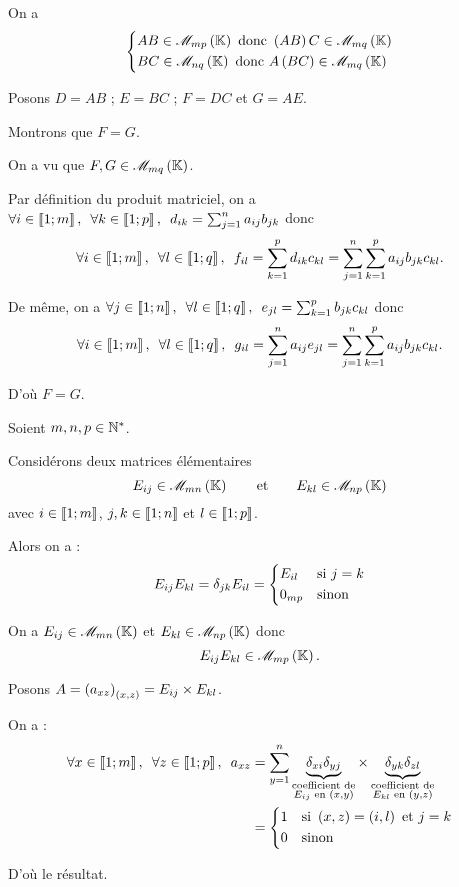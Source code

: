 \begin{dem}
On a \[\begin{dcases}
AB\in\M{mp}\text{ donc }\paren{AB}C\in\M{mq} \\
BC\in\M{nq}\text{ donc }A\paren{BC}\in\M{mq}
\end{dcases}\]

Posons \(D=AB\) ; \(E=BC\) ; \(F=DC\) et \(G=AE\).

Montrons que \(F=G\).

On a vu que \(F,G\in\M{mq}\).

Par définition du produit matriciel, on a \(\quantifs{\forall i\in\interventierii{1}{m};\forall k\in\interventierii{1}{p}}d_{ik}=\sum_{j=1}^na_{ij}b_{jk}\) donc \[\quantifs{\forall i\in\interventierii{1}{m};\forall l\in\interventierii{1}{q}}f_{il}=\sum_{k=1}^pd_{ik}c_{kl}=\sum_{j=1}^n\sum_{k=1}^pa_{ij}b_{jk}c_{kl}.\]

De même, on a \(\quantifs{\forall j\in\interventierii{1}{n};\forall l\in\interventierii{1}{q}}e_{jl}=\sum_{k=1}^pb_{jk}c_{kl}\) donc \[\quantifs{\forall i\in\interventierii{1}{m};\forall l\in\interventierii{1}{q}}g_{il}=\sum_{j=1}^na_{ij}e_{jl}=\sum_{j=1}^n\sum_{k=1}^pa_{ij}b_{jk}c_{kl}.\]

D'où \(F=G\).
\end{dem}

\begin{prop}
Soient \(m,n,p\in\mathbb{N}^*\).

Considérons deux matrices élémentaires \[E_{ij}\in\M{mn}\qquad\text{et}\qquad E_{kl}\in\M{np}\] avec \(i\in\left\llbracket1;m\right\rrbracket\), \(j,k\in\left\llbracket1;n\right\rrbracket\) et \(l\in\left\llbracket1;p\right\rrbracket\).

Alors on a : \[E_{ij}E_{kl}=\delta_{jk}E_{il}=\begin{dcases}
E_{il} &\text{si }j=k \\
0_{mp} &\text{sinon}
\end{dcases}\]
\end{prop}

\begin{dem}
On a \(E_{ij}\in\M{mn}\) et \(E_{kl}\in\M{np}\) donc \[E_{ij}E_{kl}\in\M{mp}.\]

Posons \(A=\left(a_{xz}\right)_{\left(x,z\right)}=E_{ij}\times E_{kl}\).

On a : \[\begin{aligned}
\quantifs{\forall x\in\interventierii{1}{m};\forall z\in\interventierii{1}{p}}a_{xz}&=\sum_{y=1}^n\underbrace{\delta_{xi}\delta_{yj}}_{\substack{\text{coefficient de}\\E_{ij}\text{ en }\paren{x,y}}}\times\underbrace{\delta_{yk}\delta_{zl}}_{\substack{\text{coefficient de}\\E_{kl}\text{ en }\paren{y,z}}} \\
&=\begin{dcases}
1 &\text{si }\paren{x,z}=\paren{i,l}\text{ et }j=k \\
0 &\text{sinon}
\end{dcases}
\end{aligned}\]

D'où le résultat.
\end{dem}

